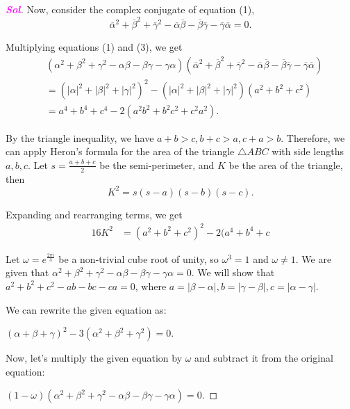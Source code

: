 \documentclass{article}
\theoremstyle{definition}
\newcommand{\sol}{\textcolor{magenta}{\bf Sol}}
\begin{document}
\begin{enumerate}
\begin{proof}[\sol]
		Now, consider the complex conjugate of equation (1),
		\begin{equation}
			\overline{\alpha}^2 + \overline{\beta}^2 + \overline{\gamma}^2 - \overline{\alpha}\overline{\beta} - \overline{\beta}\overline{\gamma} - \overline{\gamma}\overline{\alpha} = 0.
		\end{equation}
		
		Multiplying equations (1) and (3), we get
		\begin{align*}
			&(\alpha^2 + \beta^2 + \gamma^2 - \alpha\beta - \beta\gamma - \gamma\alpha)(\overline{\alpha}^2 + \overline{\beta}^2 + \overline{\gamma}^2 - \overline{\alpha}\overline{\beta} - \overline{\beta}\overline{\gamma} - \overline{\gamma}\overline{\alpha}) \\
			&= (|\alpha|^2 + |\beta|^2 + |\gamma|^2)^2 - (|\alpha|^2 + |\beta|^2 + |\gamma|^2)(a^2 + b^2 + c^2) \\
			&= a^4 + b^4 + c^4 - 2(a^2b^2 + b^2c^2 + c^2a^2).
		\end{align*}
		
		By the triangle inequality, we have $a + b > c, b + c > a, c + a > b$. Therefore, we can apply Heron's formula for the area of the triangle $\triangle ABC$ with side lengths $a, b, c$. Let $s = \frac{a+b+c}{2}$ be the semi-perimeter, and $K$ be the area of the triangle, then
		\begin{equation*}
			K^2 = s(s-a)(s-b)(s-c).
		\end{equation*}
		
		Expanding and rearranging terms, we get
		\begin{align*}
			16K^2 &= (a^2 + b^2 + c^2)^2 - 2(a^4 + b^4 + c
		\end{align*}
	
	\newpage
	
	Let $\omega = e^{\frac{2\pi i}{3}}$ be a non-trivial cube root of unity, so $\omega^3 = 1$ and $\omega \neq 1$. We are given that $\alpha^2 + \beta^2 + \gamma^2 - \alpha\beta - \beta\gamma - \gamma\alpha = 0$. We will show that $a^2 + b^2 + c^2 - ab - bc - ca = 0$, where $a = |\beta - \alpha|, b = |\gamma - \beta|, c = |\alpha - \gamma|$.
	
	We can rewrite the given equation as:
	
	$(\alpha + \beta + \gamma)^2 - 3(\alpha^2 + \beta^2 + \gamma^2) = 0$.
	
	Now, let's multiply the given equation by $\omega$ and subtract it from the original equation:
	
	$(1-\omega)(\alpha^2 + \beta^2 + \gamma^2 - \alpha\beta - \beta\gamma - \gamma\alpha) = 0$.
	

\end{proof}
\end{enumerate}
\end{document}
